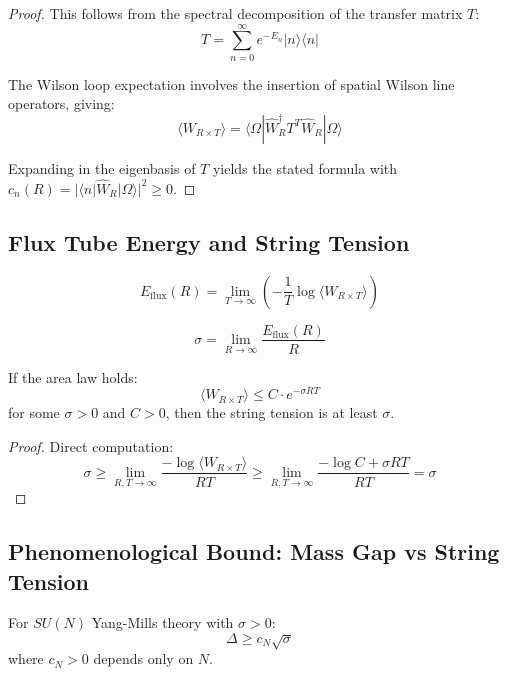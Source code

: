 \begin{proof}
This follows from the spectral decomposition of the transfer matrix $T$:
\[
T = \sum_{n=0}^\infty e^{-E_n} |n\rangle\langle n|
\]

The Wilson loop expectation involves the insertion of spatial Wilson line operators, giving:
\[
\langle W_{R \times T} \rangle = \langle \Omega | \hat{W}_R^\dagger T^T \hat{W}_R | \Omega \rangle
\]

Expanding in the eigenbasis of $T$ yields the stated formula with $c_n(R) = |\langle n | \hat{W}_R | \Omega \rangle|^2 \geq 0$.
\end{proof}

\subsection{Flux Tube Energy and String Tension}

\begin{definition}
\[
E_{\text{flux}}(R) = \lim_{T \to \infty} \left(-\frac{1}{T} \log \langle W_{R \times T} \rangle\right)
\]
\end{definition}

\begin{definition}
\[
\sigma = \lim_{R \to \infty} \frac{E_{\text{flux}}(R)}{R}
\]
\end{definition}

\begin{lemma}
\label{lem:sigma-from-area}
If the area law holds:
\[
\langle W_{R \times T} \rangle \leq C \cdot e^{-\sigma R T}
\]
for some $\sigma > 0$ and $C > 0$, then the string tension is at least $\sigma$.
\end{lemma}

\begin{proof}
Direct computation:
\[
\sigma \geq \lim_{R,T \to \infty} \frac{-\log \langle W_{R \times T} \rangle}{RT} \geq \lim_{R,T \to \infty} \frac{-\log C + \sigma R T}{RT} = \sigma
\]
\end{proof}

\subsection{Phenomenological Bound: Mass Gap vs String Tension}

\begin{conjecture}
\label{conj:gap-sigma}
For $SU(N)$ Yang-Mills theory with $\sigma > 0$:
\[
\Delta \geq c_N \sqrt{\sigma}
\]
where $c_N > 0$ depends only on $N$.
\end{conjecture}

